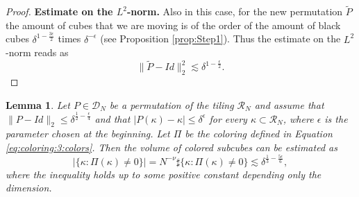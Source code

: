 \documentclass[12 pt]{article}
\theoremstyle{definition} \newtheorem{definition}{Definition}[section]
\theoremstyle{definition} \newtheorem{remark}[definition]{Remark}
\theoremstyle{plain} \newtheorem{lemma}[definition]{Lemma}
\theoremstyle{plain} \newtheorem{proposition}[definition]{Proposition}
\theoremstyle{plain} \newtheorem{theorem}[definition]{Theorem}
\theoremstyle{plain} \newtheorem{corollary}[definition]{Corollary}
\theoremstyle{definition} \newtheorem{example}[definition]{Example}
\theoremstyle{definition} \newtheorem{assumption}[definition]{Assumption}
\theoremstyle{definition} \newtheorem{conjecture}[definition]{Conjecture}
\newcommand{\1}{\mathbbm 1}
\numberwithin{equation}{section}
\begin{document}
\begin{proof}
      
       \textbf{Estimate on the $L^2$-norm.} Also in this case, for the new permutation $\tilde P$ the amount of cubes that we are moving is of the order of the amount of black cubes $\delta^{1-\frac{3\epsilon}{2}}$ times $\delta^{-\epsilon}$ (see Proposition \ref{prop:Step1}). Thus the estimate on the $L^2$-norm reads as
       \begin{equation*}
           \|\tilde P-Id\|^2_2\lesssim \delta^{1-\frac{\epsilon}{2}}.
       \end{equation*}
\end{proof}
 
\begin{lemma}\label{lem:cost:Step:2}
    Let $P\in\mathcal{D}_N$ be a permutation of the tiling $\mathcal{R}_N$ and assume that $\|P-Id\|_2\leq\delta^{\frac{1}{2}-\frac{\epsilon}{4}}$ and that $|P(\kappa)-\kappa|\leq\delta^\epsilon$ for every $\kappa\subset\mathcal{R}_N$, where $\epsilon$ is the parameter chosen at the beginning. Let $\Pi$ be the coloring defined in Equation \eqref{eq:coloring:3:colors}. Then the volume of colored subcubes can be estimated as
    \begin{equation*}
|\lbrace \kappa:\Pi(\kappa)\not=0\rbrace|=N^{-\nu}\sharp\lbrace\kappa:\Pi(\kappa)\not=0\rbrace\lesssim \delta^{\frac{1}{3}-\frac{5\epsilon}{6}}, 
    \end{equation*}
    where the inequality holds up to some positive constant depending only the dimension.
\end{lemma}
\end{document}
